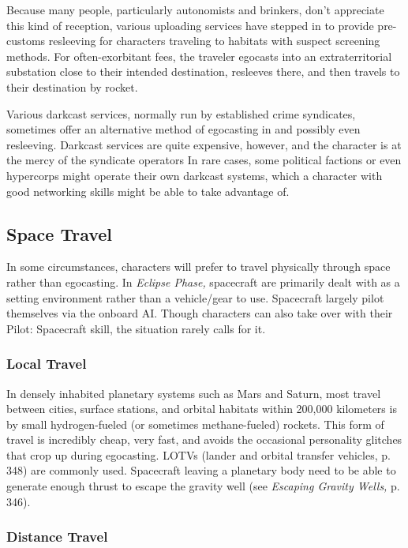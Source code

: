 Because many people, particularly autonomists and brinkers, don't appreciate this kind of reception, various uploading services have stepped in to provide pre-customs resleeving for characters traveling to habitats with suspect screening methods. For often-exorbitant fees, the traveler egocasts into an extraterritorial substation close to their intended destination, resleeves there, and then travels to their destination by rocket. 

Various darkcast services, normally run by established crime syndicates, sometimes offer an alternative method of egocasting in and possibly even resleeving. Darkcast services are quite expensive, however, and the character is at the mercy of the syndicate operators In rare cases, some political factions or even hypercorps might operate their own darkcast systems, which a character with good networking skills might be able to take advantage of. 

\subsection{Space Travel} 

In some circumstances, characters will prefer to travel physically through space rather than egocasting. In \textit{Eclipse Phase,} spacecraft are primarily dealt with as a setting environment rather than a vehicle/gear to use. Spacecraft largely pilot themselves via the onboard AI. Though characters can also take over with their Pilot: Spacecraft skill, the situation rarely calls for it. 

\subsubsection{Local Travel} 

In densely inhabited planetary systems such as Mars and Saturn, most travel between cities, surface stations, and orbital habitats within 200,000 kilometers is by small hydrogen-fueled (or sometimes methane-fueled) rockets. This form of travel is incredibly cheap, very fast, and avoids the occasional personality glitches that crop up during egocasting. LOTVs (lander and orbital transfer vehicles, p. 348) are commonly used. Spacecraft leaving a planetary body need to be able to generate enough thrust to escape the gravity well (see \textit{Escaping Gravity Wells,} p. 346). 

\subsubsection{Distance Travel} 

